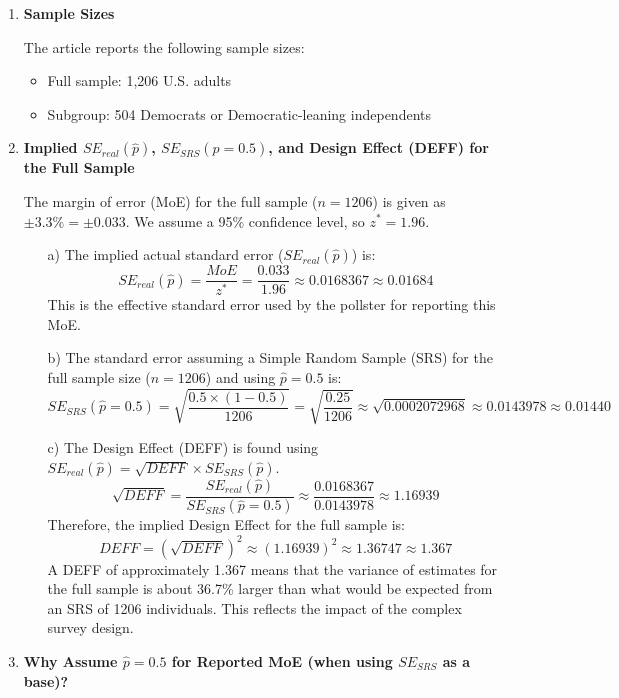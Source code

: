 \documentclass[12pt]{article}
\begin{document}
\begin{enumerate}

\item \textbf{Sample Sizes}

The article reports the following sample sizes:
\begin{itemize}
\item Full sample: 1,206 U.S. adults
\item Subgroup: 504 Democrats or Democratic-leaning independents
\end{itemize}

\item \textbf{Implied $SE_{real}(\hat{p})$, $SE_{SRS}(\hat{p}=0.5)$, and Design Effect (DEFF) for the Full Sample}

The margin of error (MoE) for the full sample ($n=1206$) is given as $\pm 3.3\% = \pm 0.033$.
We assume a 95\% confidence level, so $z^* = 1.96$.

\begin{itemize}
    \item[a)] The implied actual standard error ($SE_{real}(\hat{p})$) is:
    \[
    SE_{real}(\hat{p}) = \frac{MoE}{z^*} = \frac{0.033}{1.96} \approx 0.0168367 \approx 0.01684
    \]
    This is the effective standard error used by the pollster for reporting this MoE.

    \item[b)] The standard error assuming a Simple Random Sample (SRS) for the full sample size ($n=1206$) and using $\hat{p}=0.5$ is:
    \[
    SE_{SRS}(\hat{p}=0.5) = \sqrt{\frac{0.5 \times (1-0.5)}{1206}} = \sqrt{\frac{0.25}{1206}} \approx \sqrt{0.0002072968} \approx 0.0143978 \approx 0.01440
    \]

    \item[c)] The Design Effect (DEFF) is found using $SE_{real}(\hat{p}) = \sqrt{DEFF} \times SE_{SRS}(\hat{p})$.
    \[
    \sqrt{DEFF} = \frac{SE_{real}(\hat{p})}{SE_{SRS}(\hat{p}=0.5)} \approx \frac{0.0168367}{0.0143978} \approx 1.16939
    \]
    Therefore, the implied Design Effect for the full sample is:
    \[
    DEFF = (\sqrt{DEFF})^2 \approx (1.16939)^2 \approx 1.36747 \approx 1.367
    \]
    A DEFF of approximately 1.367 means that the variance of estimates for the full sample is about 36.7\% larger than what would be expected from an SRS of 1206 individuals. This reflects the impact of the complex survey design.
\end{itemize}


\item \textbf{Why Assume $\hat{p} = 0.5$ for Reported MoE (when using $SE_{SRS}$ as a base)?}


\end{enumerate}
\end{document}
